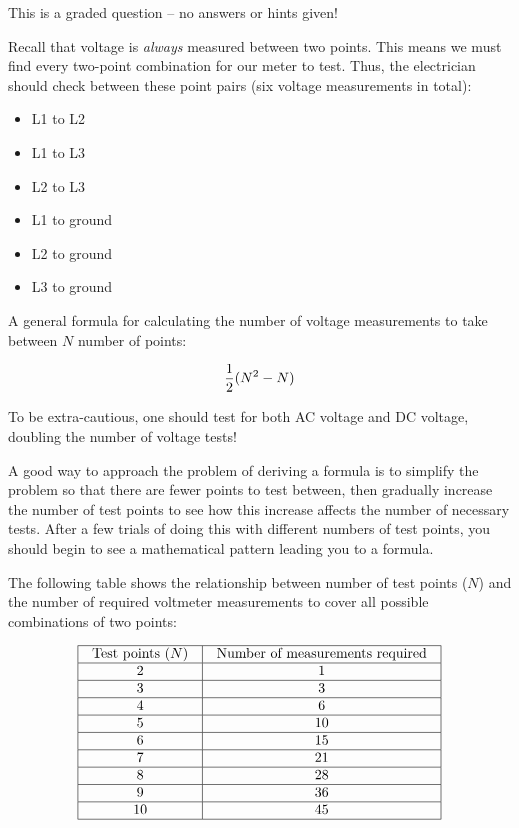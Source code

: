 
This is a graded question -- no answers or hints given!







Recall that voltage is {\it always} measured between two points.  This means we must find every two-point combination for our meter to test.  Thus, the electrician should check between these point pairs (six voltage measurements in total):

\begin{itemize}
\item{} L1 to L2
\item{} L1 to L3
\item{} L2 to L3
\item{} L1 to ground
\item{} L2 to ground
\item{} L3 to ground
\end{itemize}

A general formula for calculating the number of voltage measurements to take between $N$ number of points:

$${1 \over 2}(N^2 - N)$$

\vskip 10pt

To be extra-cautious, one should test for both AC voltage and DC voltage, doubling the number of voltage tests!

\vskip 10pt

A good way to approach the problem of deriving a formula is to simplify the problem so that there are fewer points to test between, then gradually increase the number of test points to see how this increase affects the number of necessary tests.  After a few trials of doing this with different numbers of test points, you should begin to see a mathematical pattern leading you to a formula.

The following table shows the relationship between number of test points ($N$) and the number of required voltmeter measurements to cover all possible combinations of two points:


$$\vbox{\offinterlineskip
\halign{\strut
\vrule \quad\hfil # \ \hfil & 
\vrule \quad\hfil # \ \hfil \vrule \cr
\noalign{\hrule}
%
Test points ($N$) & Number of measurements required \cr
%
\noalign{\hrule}
%
2 & 1 \cr
%
\noalign{\hrule}
%
3 & 3 \cr
%
\noalign{\hrule}
%
4 & 6 \cr
%
\noalign{\hrule}
%
5 & 10 \cr
%
\noalign{\hrule}
%
6 & 15 \cr
%
\noalign{\hrule}
%
7 & 21 \cr
%
\noalign{\hrule}
%
8 & 28 \cr
%
\noalign{\hrule}
%
9 & 36 \cr
%
\noalign{\hrule}
%
10 & 45 \cr
%
\noalign{\hrule}
} %
}$$ %

